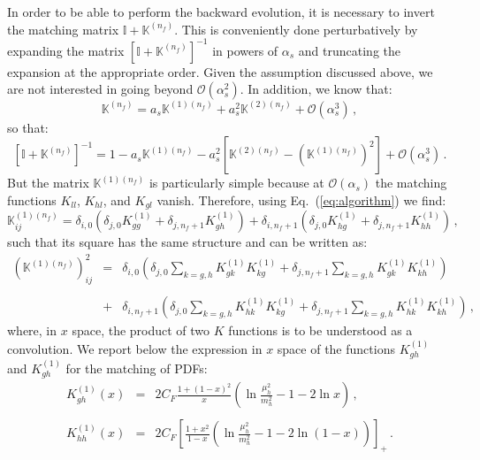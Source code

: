 \documentclass[10pt,a4paper]{article}
\begin{document}
In order to be able to perform the backward evolution, it is necessary
to invert the matching matrix $\mathbb{I}+\mathbb{K}^{(n_f)}$. This is
conveniently done perturbatively by expanding the matrix
$\left[\mathbb{I}+\mathbb{K}^{(n_f)}\right]^{-1}$ in powers of
$\alpha_s$ and truncating the expansion at the appropriate
order. Given the assumption discussed above, we are not interested in
going beyond $\mathcal{O}(\alpha_s^2)$. In addition, we know that:
\begin{equation}
\mathbb{K}^{(n_f)} = a_s \mathbb{K}^{(1)(n_f)}+a_s^2 \mathbb{K}^{(2)(n_f)}+\mathcal{O}(\alpha_s^3)\,,
\end{equation}
so that:
\begin{equation}
\left[\mathbb{I}+\mathbb{K}^{(n_f)}\right]^{-1} = 1 - a_s
\mathbb{K}^{(1)(n_f)}-a_s^2\left[\mathbb{K}^{(2)(n_f)}-\left(\mathbb{K}^{(1)(n_f)}\right)^2\right]+\mathcal{O}(\alpha_s^3)\,.
\label{eq:inversion}
\end{equation}
But the matrix $\mathbb{K}^{(1)(n_f)}$ is particularly simple because
at $\mathcal{O}(\alpha_s)$ the matching functions $K_{ll}$, $K_{hl}$,
and $K_{gl}$ vanish. Therefore, using Eq.~(\ref{eq:algorithm}) we
find:
\begin{equation}
\mathbb{K}_{ij}^{(1)(n_f)} =\delta_{i,0}\left(\delta_{j,0}K_{gg}^{(1)} +
\delta_{j,n_f+1}K_{gh}^{(1)}\right)+ \delta_{i,n_f+1}\left(\delta_{j,0}K_{hg}^{(1)}
+ \delta_{j,n_f+1}K_{hh}^{(1)}\right)\,,
\end{equation}
such that its square has the same structure and can be written as:
\begin{equation}
\begin{array}{rcl}
\left(\mathbb{K}^{(1)(n_f)}\right) _{ij}^2 &=&\displaystyle \delta_{i,0}\left(\delta_{j,0}\sum_{k=g,h}K_{gk}^{(1)} K_{kg}^{(1)} +
\delta_{j,n_f+1}\sum_{k=g,h}K_{gk}^{(1)} K_{kh}^{(1)}\right)\\
\\
  &+&\displaystyle  \delta_{i,n_f+1}\left(\delta_{j,0}\sum_{k=g,h}K_{hk}^{(1)} K_{kg}^{(1)}
+ \delta_{j,n_f+1}\sum_{k=g,h}K_{hk}^{(1)} K_{kh}^{(1)}\right)\,,
\end{array}
\label{eq:squareK1}
\end{equation}
where, in $x$ space, the product of two $K$ functions is to be
understood as a convolution. We report below the expression in $x$
space of the functions $K_{gh}^{(1)}$ and $K_{gh}^{(1)}$ for the
matching of PDFs:
\begin{equation}
\begin{array}{rcl}
\displaystyle K_{gh}^{(1)}(x) &=&\displaystyle 
2C_F\frac{1+(1-x)^2}{x}\left(\ln\frac{\mu_h^2}{m_h^2}-1-2\ln x\right)\,,\\
\\
\displaystyle K_{hh}^{(1)}(x) &=&\displaystyle 
2C_F\left[\frac{1+x^2}{1-x}\left(\ln\frac{\mu_h^2}{m_h^2}-1-2\ln(1-x)\right)\right]_+\,.
\end{array}
\end{equation}
\end{document}
